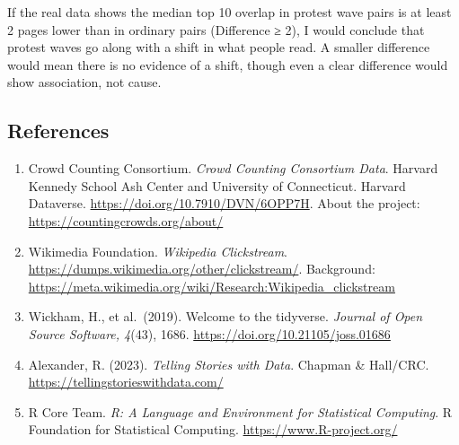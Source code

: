 \documentclass[
  9pt,
  letterpaper,
  DIV=11,
  numbers=noendperiod]{scrartcl}
\providecommand{\tightlist}{%
  \setlength{\itemsep}{0pt}\setlength{\parskip}{0pt}}
\begin{document}
If the real data shows the median top 10 overlap in protest wave pairs
is at least 2 pages lower than in ordinary pairs (Difference ≥ 2), I
would conclude that protest waves go along with a shift in what people
read. A smaller difference would mean there is no evidence of a shift,
though even a clear difference would show association, not cause.

\subsection{References}\label{references}

\begin{enumerate}
\def\labelenumi{\arabic{enumi}.}
\tightlist
\item
  Crowd Counting Consortium. \emph{Crowd Counting Consortium Data}.
  Harvard Kennedy School Ash Center and University of Connecticut.
  Harvard Dataverse. \url{https://doi.org/10.7910/DVN/6OPP7H}. About the
  project: \url{https://countingcrowds.org/about/}
\item
  Wikimedia Foundation. \emph{Wikipedia Clickstream}.
  \url{https://dumps.wikimedia.org/other/clickstream/}. Background:
  \url{https://meta.wikimedia.org/wiki/Research:Wikipedia_clickstream}
\item
  Wickham, H., et al.~(2019). Welcome to the tidyverse. \emph{Journal of
  Open Source Software, 4}(43), 1686.
  \url{https://doi.org/10.21105/joss.01686}
\item
  Alexander, R. (2023). \emph{Telling Stories with Data}. Chapman \&
  Hall/CRC. \url{https://tellingstorieswithdata.com/}
\item
  R Core Team. \emph{R: A Language and Environment for Statistical
  Computing}. R Foundation for Statistical Computing.
  \url{https://www.R-project.org/}
\end{enumerate}
\end{document}
